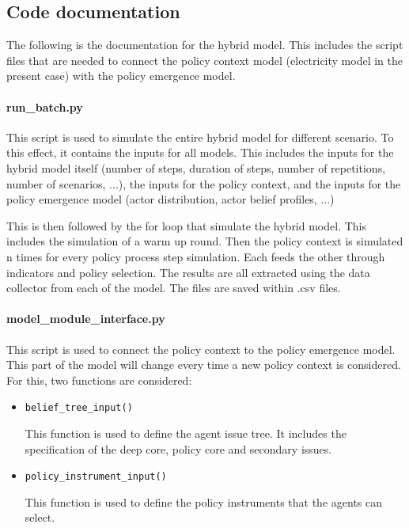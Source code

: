 \documentclass[12pt]{article}
\begin{document}
\subsection{Code documentation}

The following is the documentation for the hybrid model. This includes the script files that are needed to connect the policy context model (electricity model in the present case) with the policy emergence model.


\paragraph{run\_batch.py}

This script is used to simulate the entire hybrid model for different scenario. To this effect, it contains the inputs for all models. This includes the inputs for the hybrid model itself (number of steps, duration of steps, number of repetitions, number of scenarios, ...), the inputs for the policy context, and the inputs for the policy emergence model (actor distribution, actor belief profiles, ...)

This is then followed by the for loop that simulate the hybrid model. This includes the simulation of a warm up round. Then the policy context is simulated n times for every policy process step simulation. Each feeds the other through indicators and policy selection. The results are all extracted using the data collector from each of the model. The files are saved within .csv files.

\paragraph{model\_module\_interface.py}

This script is used to connect the policy context to the policy emergence model. This part of the model will change every time a new policy context is considered. For this, two functions are considered:

\begin{itemize}
\item \texttt{belief\_tree\_input()}

This function is used to define the agent issue tree. It includes the specification of the deep core, policy core and secondary issues.

\item \texttt{policy\_instrument\_input()}

This function is used to define the policy instruments that the agents can select.

\end{itemize}
\end{document}
